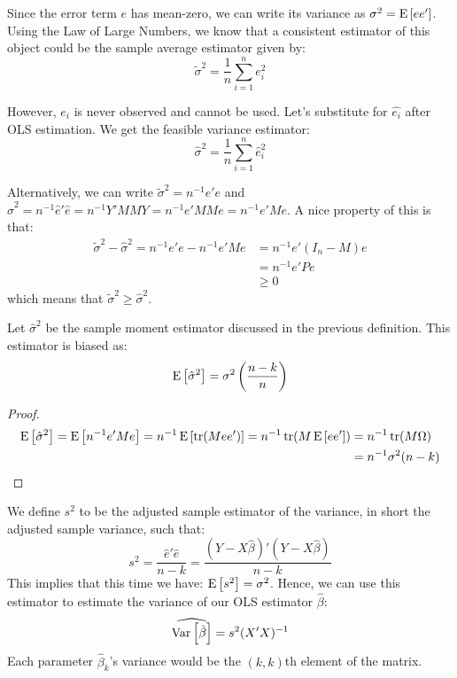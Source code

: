 \begin{definition}
Since the error term $e$ has mean-zero, we can write its variance as $\sigma^2 = \operatorname{E}\left[ee'\right]$. Using the Law of Large Numbers, we know that a consistent estimator of this object could be the sample average estimator given by: $$\tilde{\sigma}^2 = \frac{1}{n}\sum_{i=1}^n e_i^2 $$ 

However, $e_i$ is never observed and cannot be used. Let's substitute for $\hat{e_i}$ after OLS estimation. We get the feasible variance estimator:$$\hat{\sigma}^2 = \frac{1}{n} \sum_{i=1}^n \hat e_i^2 $$ 

Alternatively, we can write $\tilde{\sigma}^2 = n^{-1}e'e$ and $\hat{\sigma}^2 = n^{-1}\hat{e}'\hat{e} = n^{-1}Y'MMY = n^{-1}e'MMe = n^{-1}e'Me$. A nice property of this is that:\begin{align*}
\tilde{\sigma}^2 - \hat{\sigma}^2 = n^{-1}e'e - n^{-1}e'Me & = n^{-1}e'(I_n - M)e \\
& = n^{-1}e'Pe \\
& \geq 0
\end{align*}which means that $\tilde{\sigma}^2 \geq \hat{\sigma}^2$.
\end{definition}

\begin{proposition}
Let $\hat\sigma^2$ be the sample moment estimator discussed in the previous definition. This estimator is biased as: $$\operatorname{E}\left[\hat{\sigma}^2\right] = \sigma^2\left(\frac{n-k}{n}\right)$$
\end{proposition}
\begin{proof}
\begin{align*}
\operatorname{E}\left[\hat\sigma^2\right] = \operatorname{E}\left[n^{-1}e'Me\right] = n^{-1}\operatorname{E}\left[\operatorname{tr}(Mee')\right] = n^{-1}\operatorname{tr}(M\operatorname{E}\left[ee'\right]) & = n^{-1}\operatorname{tr}(M\Omega) \\ & = n^{-1}\sigma^2(n-k)
\end{align*}
\end{proof}

\begin{definition}
We define $s^2$ to be the adjusted sample estimator of the variance, in short the adjusted sample variance, such that: $$s^2 = \frac{\hat e'\hat e}{n-k}=\frac{(Y - X\hat{\beta})'(Y - X\hat{\beta})}{n-k}$$ This implies that this time we have: $\operatorname{E}\left[s^2\right] = \sigma^2$. 
Hence, we can use this estimator to estimate the variance of our OLS estimator $\hat\beta$: $$\widehat{\operatorname{Var}\left[\hat{\beta}\right]} = s^2(X'X)^{-1}$$ Each parameter $\hat{\beta}_k$'s variance would be the $(k,k)$th element of the matrix.
\end{definition}

